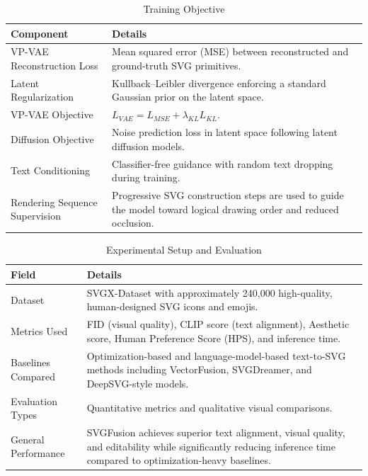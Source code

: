 \begin{table}[h!]
\centering
\caption{Training Objective}
\begin{tabular}{|l|p{10cm}|}
\hline
\textbf{Component} & \textbf{Details} \\ \hline
VP-VAE Reconstruction Loss &
Mean squared error (MSE) between reconstructed and ground-truth SVG primitives. \\ \hline
Latent Regularization &
Kullback–Leibler divergence enforcing a standard Gaussian prior on the latent space. \\ \hline
VP-VAE Objective &
$L_{VAE} = L_{MSE} + \lambda_{KL} L_{KL}$. \\ \hline
Diffusion Objective &
Noise prediction loss in latent space following latent diffusion models. \\ \hline
Text Conditioning &
Classifier-free guidance with random text dropping during training. \\ \hline
Rendering Sequence Supervision &
Progressive SVG construction steps are used to guide the model toward logical drawing order and reduced occlusion. \\ \hline
\end{tabular}
\end{table}

\begin{table}[h!]
\centering
\caption{Experimental Setup and Evaluation}
\begin{tabular}{|l|p{10cm}|}
\hline
\textbf{Field} & \textbf{Details} \\ \hline
Dataset &
SVGX-Dataset with approximately 240,000 high-quality, human-designed SVG icons and emojis. \\ \hline
Metrics Used &
FID (visual quality), CLIP score (text alignment), Aesthetic score, Human Preference Score (HPS), and inference time. \\ \hline
Baselines Compared &
Optimization-based and language-model-based text-to-SVG methods including VectorFusion, SVGDreamer, and DeepSVG-style models. \\ \hline
Evaluation Types &
Quantitative metrics and qualitative visual comparisons. \\ \hline
General Performance &
SVGFusion achieves superior text alignment, visual quality, and editability while significantly reducing inference time compared to optimization-heavy baselines. \\ \hline
\end{tabular}
\end{table}


